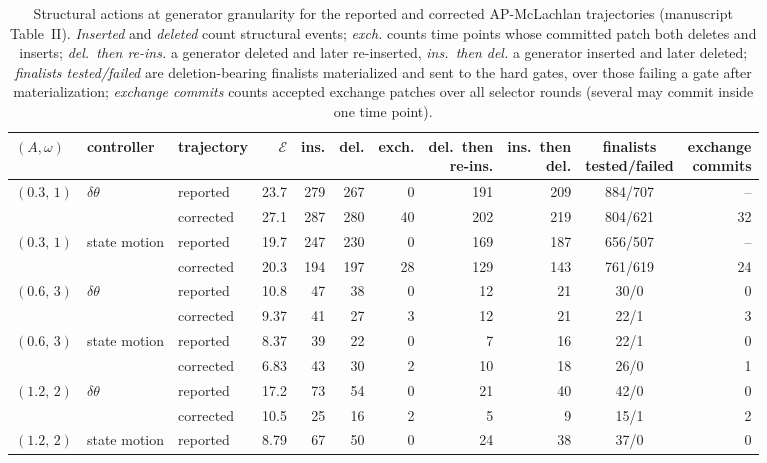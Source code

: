 \documentclass[10pt]{article}
\begin{document}
\begin{table}[H]\centering\scriptsize\setlength{\tabcolsep}{3.5pt}
\caption{Structural actions at generator granularity for the reported and corrected AP-McLachlan trajectories (manuscript Table~II).  \emph{Inserted} and \emph{deleted} count structural events; \emph{exch.} counts time points whose committed patch both deletes and inserts; \emph{del.\ then re-ins.} a generator deleted and later re-inserted, \emph{ins.\ then del.} a generator inserted and later deleted; \emph{finalists tested/failed} are deletion-bearing finalists materialized and sent to the hard gates, over those failing a gate after materialization; \emph{exchange commits} counts accepted exchange patches over all selector rounds (several may commit inside one time point).}
\begin{tabular}{lllrrrrrrcr}\toprule
$(A,\omega)$ & controller & trajectory & $\mathcal E$ & ins. & del. & exch. & \shortstack{del.\ then\\re-ins.} & \shortstack{ins.\ then\\del.} & \shortstack{finalists\\tested/failed} & \shortstack{exchange\\commits} \\ \midrule
$(0.3,\,1)$ & $\delta\theta$ & reported & 23.7 & 279 & 267 & 0 & 191 & 209 & 884/707 & -- \\
 &  & corrected & 27.1 & 287 & 280 & 40 & 202 & 219 & 804/621 & 32 \\
\addlinespace[2pt]
$(0.3,\,1)$ & state motion & reported & 19.7 & 247 & 230 & 0 & 169 & 187 & 656/507 & -- \\
 &  & corrected & 20.3 & 194 & 197 & 28 & 129 & 143 & 761/619 & 24 \\
\addlinespace[2pt]
$(0.6,\,3)$ & $\delta\theta$ & reported & 10.8 & 47 & 38 & 0 & 12 & 21 & 30/0 & 0 \\
 &  & corrected & 9.37 & 41 & 27 & 3 & 12 & 21 & 22/1 & 3 \\
\addlinespace[2pt]
$(0.6,\,3)$ & state motion & reported & 8.37 & 39 & 22 & 0 & 7 & 16 & 22/1 & 0 \\
 &  & corrected & 6.83 & 43 & 30 & 2 & 10 & 18 & 26/0 & 1 \\
\addlinespace[2pt]
$(1.2,\,2)$ & $\delta\theta$ & reported & 17.2 & 73 & 54 & 0 & 21 & 40 & 42/0 & 0 \\
 &  & corrected & 10.5 & 25 & 16 & 2 & 5 & 9 & 15/1 & 2 \\
\addlinespace[2pt]
$(1.2,\,2)$ & state motion & reported & 8.79 & 67 & 50 & 0 & 24 & 38 & 37/0 & 0 \\

\end{tabular}
\end{table}
\end{document}
